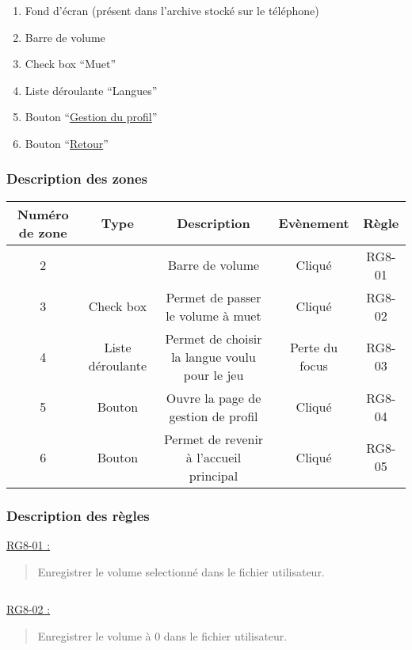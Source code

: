 \documentclass{report}
\begin{document}
		\begin{enumerate}
		  \item Fond d'écran (présent dans l'archive stocké sur le téléphone)
		  \item Barre de volume
		  \item Check box ``Muet''
		  \item Liste déroulante ``Langues''
		  \item Bouton ``\hyperlink{Gestion du profil}{Gestion du profil}''
		  \item Bouton ``\hyperlink{Accueil}{Retour}''
		\end{enumerate}

		\subsubsection{Description des zones}
		
			\begin{tabular}{|c|c|c|c|c|} \hline
				Numéro de zone & Type  & Description & Evènement &	Règle \\\hline
				2 & & Barre de volume & Cliqué & RG8-01 \\\hline
				3 & Check box & Permet de passer le volume à muet & Cliqué & RG8-02 \\\hline
				4 & Liste déroulante & Permet de choisir la langue voulu pour le jeu & Perte du focus & RG8-03 \\\hline 
				5 & Bouton & Ouvre la page de gestion de profil & Cliqué & RG8-04 \\\hline 
				6 & Bouton & Permet de revenir à l'accueil principal & Cliqué & RG8-05 \\\hline
			\end{tabular}
			
		\subsubsection{Description des règles}

			\underline{RG8-01 :}
				\begin{quote}
					Enregistrer le volume selectionné dans le fichier utilisateur.
				\end{quote}

			$\,$	

			\underline{RG8-02 :}
				\begin{quote}
					Enregistrer le volume à 0 dans le fichier utilisateur.
				\end{quote}
\end{document}
